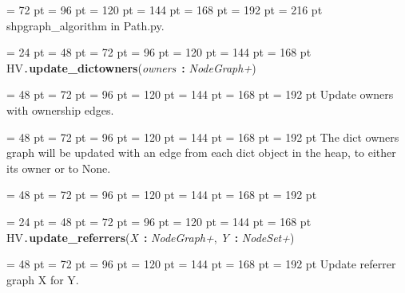 {{{{{{\par \noindent  \leftskip = 72 pt  \leftmargini = 96 pt  \leftmarginii = 120 pt  \leftmarginiii = 144 pt  \leftmarginiv = 168 pt  \leftmarginv = 192 pt  \leftmarginvi = 216 pt  shpgraph{\_}algorithm in Path.py.
\par}
\par}
\par}
\par}
\par}
{\par \noindent  \leftskip = 24 pt  \leftmargini = 48 pt  \leftmarginii = 72 pt  \leftmarginiii = 96 pt  \leftmarginiv = 120 pt  \leftmarginv = 144 pt  \leftmarginvi = 168 pt HV{\tt .\/}{\bf {\large {\bf update{\_}dictowners\/}}\/}({\em owners\/}~{\bf :}  {\em NodeGraph+\/}){\par \noindent
{\par \noindent  \leftskip = 48 pt  \leftmargini = 72 pt  \leftmarginii = 96 pt  \leftmarginiii = 120 pt  \leftmarginiv = 144 pt  \leftmarginv = 168 pt  \leftmarginvi = 192 pt  Update owners with ownership edges.\par}
{\par \noindent  \leftskip = 48 pt  \leftmargini = 72 pt  \leftmarginii = 96 pt  \leftmarginiii = 120 pt  \leftmarginiv = 144 pt  \leftmarginv = 168 pt  \leftmarginvi = 192 pt  The dict owners graph will be updated with an edge from each dict
object in the heap, to either its owner or to None.
\par}
{\par \noindent  \leftskip = 48 pt  \leftmargini = 72 pt  \leftmarginii = 96 pt  \leftmarginiii = 120 pt  \leftmarginiv = 144 pt  \leftmarginv = 168 pt  \leftmarginvi = 192 pt {\par \noindent
\par}
\par}
\par}
\par}
{\par \noindent  \leftskip = 24 pt  \leftmargini = 48 pt  \leftmarginii = 72 pt  \leftmarginiii = 96 pt  \leftmarginiv = 120 pt  \leftmarginv = 144 pt  \leftmarginvi = 168 pt HV{\tt .\/}{\bf {\large {\bf update{\_}referrers\/}}\/}({\em X\/}~{\bf :}  {\em NodeGraph+\/}, {\em Y\/}~{\bf :}  {\em NodeSet+\/}){\par \noindent
{\par \noindent  \leftskip = 48 pt  \leftmargini = 72 pt  \leftmarginii = 96 pt  \leftmarginiii = 120 pt  \leftmarginiv = 144 pt  \leftmarginv = 168 pt  \leftmarginvi = 192 pt  Update referrer graph X for Y.\par}
}}}
